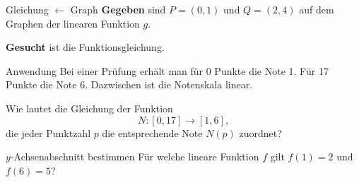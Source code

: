 \begin{bsp}
    {Gleichung \(\longleftarrow\) Graph}{}
    \textbf{Gegeben} sind \(P=(0, 1)\) und \(Q=(2, 4)\)
    auf dem Graphen der linearen Funktion \(g\).

    \textbf{Gesucht} ist die Funktionsgleichung.

    \karofeld{9.2cm}
\end{bsp}

\begin{bsp}
    {Anwendung}{}
    Bei einer Prüfung erhält man für 0 Punkte die Note 1.
    Für 17 Punkte die Note 6. Dazwischen ist die Notenskala linear.

    Wie lautet die Gleichung der Funktion
    \[
        N\colon [0,17] \to [1,6],
    \]
    die jeder Punktzahl \(p\) die entsprechende Note \(N(p)\) zuordnet?

\end{bsp}


\begin{bsp}
    {\(y\)-Achsenabschnitt bestimmen}{}
    Für welche lineare Funktion \(f\) gilt \(f(1) = 2\) und \(f(6) = 5\)?

\end{bsp}


